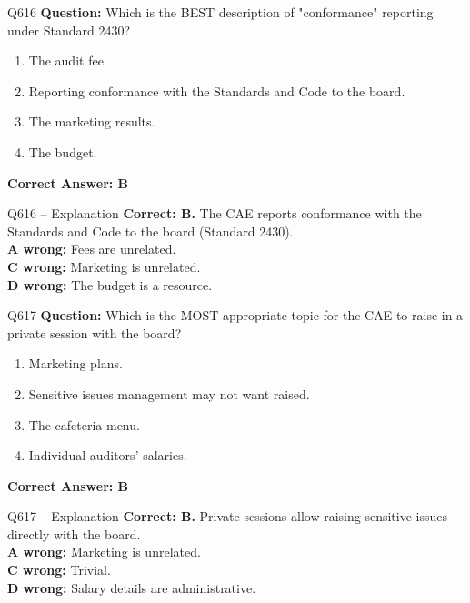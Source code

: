 \documentclass[aspectratio=169,10pt]{beamer}
\begin{document}
	\begin{frame}[t]{Q616}
		\small
		\textbf{Question:} Which is the BEST description of "conformance" reporting under Standard 2430?
		\begin{enumerate}[label=\Alph*.,itemsep=1pt,topsep=2pt]
			\item The audit fee.
			\item Reporting conformance with the Standards and Code to the board.
			\item The marketing results.
			\item The budget.
		\end{enumerate}
		\vspace{4pt}
		\textbf{Correct Answer: B}
	\end{frame}
	
	\begin{frame}[t]{Q616 -- Explanation}
		\small
		\textbf{Correct: B.} The CAE reports conformance with the Standards and Code to the board (Standard 2430). \\[4pt]
		\textbf{A wrong:} Fees are unrelated. \\[2pt]
		\textbf{C wrong:} Marketing is unrelated. \\[2pt]
		\textbf{D wrong:} The budget is a resource.
	\end{frame}
	
	\begin{frame}[t]{Q617}
		\small
		\textbf{Question:} Which is the MOST appropriate topic for the CAE to raise in a private session with the board?
		\begin{enumerate}[label=\Alph*.,itemsep=1pt,topsep=2pt]
			\item Marketing plans.
			\item Sensitive issues management may not want raised.
			\item The cafeteria menu.
			\item Individual auditors' salaries.
		\end{enumerate}
		\vspace{4pt}
		\textbf{Correct Answer: B}
	\end{frame}
	
	\begin{frame}[t]{Q617 -- Explanation}
		\small
		\textbf{Correct: B.} Private sessions allow raising sensitive issues directly with the board. \\[4pt]
		\textbf{A wrong:} Marketing is unrelated. \\[2pt]
		\textbf{C wrong:} Trivial. \\[2pt]
		\textbf{D wrong:} Salary details are administrative.
	\end{frame}
	
\end{document}
